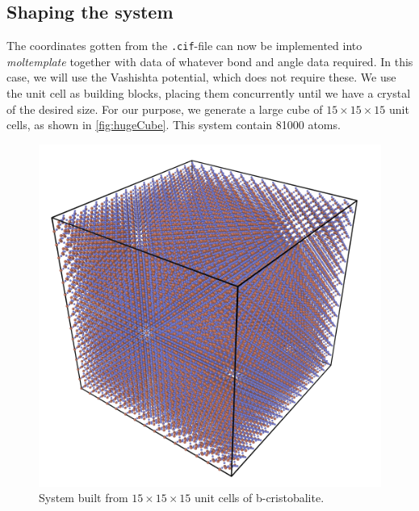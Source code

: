 \documentclass[twoside,english]{uiofysmaster}
\begin{document}
\subsection{Shaping the system}
The coordinates gotten from the \texttt{.cif}-file can now be implemented into \textit{moltemplate} together with data of whatever bond and angle data required. In this case, we will use the Vashishta potential, which does not require these. We use the unit cell as building blocks, placing them concurrently until we have a crystal of the desired size. For our purpose, we generate a large cube of $15\times15\times15$ unit cells, as shown in \autoref{fig:hugeCube}. This system contain 81000 atoms.

\begin{figure}
	\centering
	\includegraphics[width=0.7\linewidth]{figures/CreatingSystem/hugeCube}
	\caption{System built from $15\times15\times15$ unit cells of b-cristobalite.}
	\label{fig:hugeCube}
\end{figure}





\end{document}
